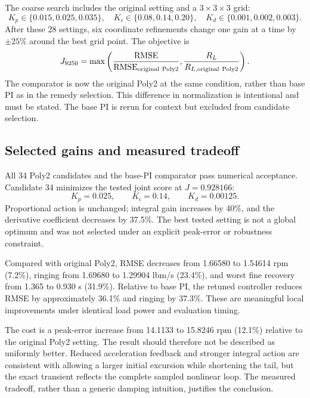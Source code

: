 The coarse search includes the original setting and a $3\times3\times3$ grid:
\begin{equation}
K_p\in\{0.015,0.025,0.035\},\quad
K_i\in\{0.08,0.14,0.20\},\quad
K_d\in\{0.001,0.002,0.003\}.
\end{equation}
After these 28 settings, six coordinate refinements change one gain at a time by $\pm25\%$ around the best grid point. The objective is
\begin{equation}
J_{9250}=\max\left(\frac{\operatorname{RMSE}}{\operatorname{RMSE}_{\rm original\ Poly2}},
\frac{R_L}{R_{L,\rm original\ Poly2}}\right).
\end{equation}
The comparator is now the original Poly2 at the same condition, rather than base PI as in the remedy selection. This difference in normalization is intentional and must be stated. The base PI is rerun for context but excluded from candidate selection.

\subsection{Selected gains and measured tradeoff}
All 34 Poly2 candidates and the base-PI comparator pass numerical acceptance. Candidate 34 minimizes the tested joint score at $J=0.928166$:
\begin{equation}
\boxed{K_p=0.025,\qquad K_i=0.14,\qquad K_d=0.00125.}
\end{equation}
Proportional action is unchanged; integral gain increases by 40\%, and the derivative coefficient decreases by 37.5\%. The best tested setting is not a global optimum and was not selected under an explicit peak-error or robustness constraint.


Compared with original Poly2, RMSE decreases from 1.66580 to 1.54614 rpm (7.2\%), ringing from 1.69680 to 1.29904 lbm/s (23.4\%), and worst fine recovery from 1.365 to 0.930 s (31.9\%). Relative to base PI, the retuned controller reduces RMSE by approximately 36.1\% and ringing by 37.3\%. These are meaningful local improvements under identical load power and evaluation timing.

The cost is a peak-error increase from 14.1133 to 15.8246 rpm (12.1\%) relative to the original Poly2 setting. The result should therefore not be described as uniformly better. Reduced acceleration feedback and stronger integral action are consistent with allowing a larger initial excursion while shortening the tail, but the exact transient reflects the complete sampled nonlinear loop. The measured tradeoff, rather than a generic damping intuition, justifies the conclusion.

